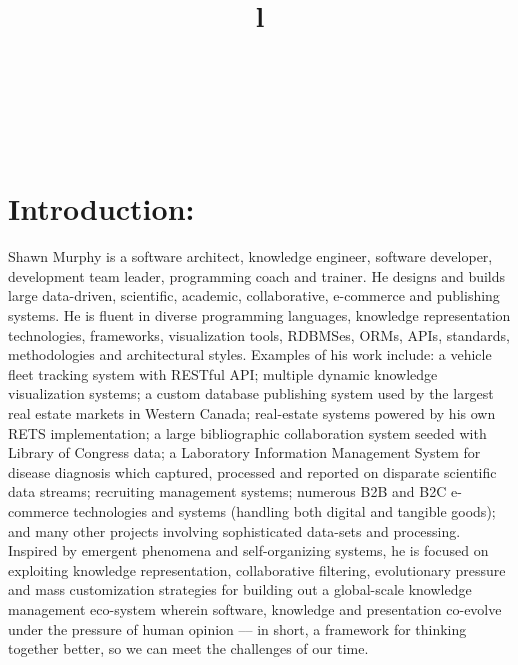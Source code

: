 \resumewidth=7in
\begin{resume}

\begin{format}
\title{l}\\
\\
\body\\
\end{format}


\section{Introduction:}
\begin{par}

Shawn Murphy is a software architect, knowledge engineer,
software developer, development team leader, programming coach
and trainer.
He designs and builds large data-driven, scientific, academic, 
collaborative, e-commerce and publishing systems. 
He is fluent in diverse programming languages, knowledge
representation technologies, frameworks, visualization tools, RDBMSes,
ORMs, APIs, standards, methodologies and architectural styles. 
Examples of his work include:  
  a vehicle fleet tracking system with RESTful API;
  multiple dynamic knowledge visualization systems;
  a custom database publishing system used by the largest real estate
    markets in Western Canada;
  real-estate systems powered by his own RETS implementation; 
  a large bibliographic collaboration system seeded with Library of Congress data; 
  a Laboratory Information Management System for disease diagnosis which 
    captured, processed and reported on disparate scientific data streams; 
  recruiting management systems;
  numerous B2B and B2C e-commerce technologies and systems 
    (handling both digital and tangible goods);
  and many other projects involving sophisticated data-sets and processing. 
Inspired by emergent phenomena and
self-organizing systems, he is focused on exploiting knowledge
representation, collaborative filtering, evolutionary pressure and
mass customization strategies for building out a global-scale
knowledge management eco-system wherein software, knowledge and presentation
co-evolve under the pressure of human opinion --– in short, a framework for 
thinking together better, so we can meet the challenges of our time.

\end{par}






\end{resume}
